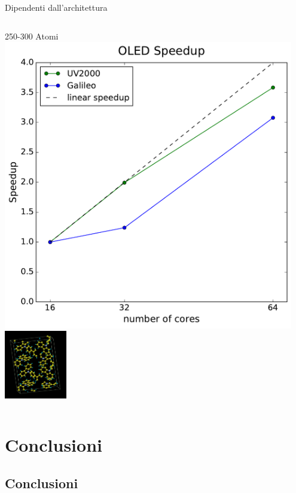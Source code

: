 \documentclass[8pt]{beamer}
\begin{document}
\begin{frame}{Dipendenti dall'architettura}
\begin{columns}
	\begin{center}	
		250-300 Atomi\\
		\includegraphics[width=0.95\textwidth]{concl_oled.pdf}	\\	
		\includegraphics[height=3cm]{beam_cbp.png}
	\end{center}		
	
	\end{columns}
	

\end{frame}






\section{Conclusioni}
\subsection{Conclusioni}
\end{document}
